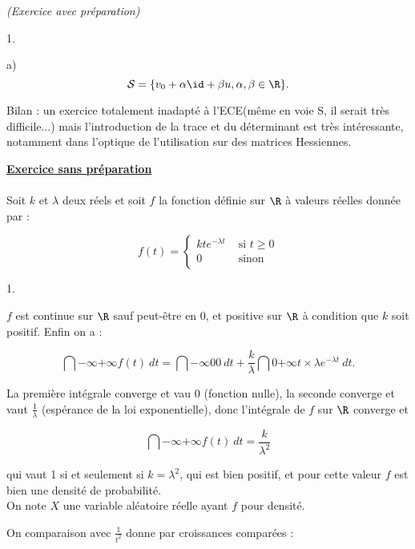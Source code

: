 \documentclass[11pt]{article}%
\begin{document}
\begin{exercice}{\it (Exercice avec préparation)}
\begin{noliste}{1.}
\begin{noliste}{a)}
\[
 \mathcal{S} = \{ v_{0} + \alpha \id + \beta u, \alpha, \beta \in \R
\}. 
\]


 Bilan : un exercice totalement inadapté à l'ECE(même en voie S, il
serait très difficile...) mais l'introduction de la trace et du
déterminant est très intéressante, notamment dans l'optique de
l'utilisation sur des matrices Hessiennes. \\

 \end{noliste}

 \end{noliste}

 \noindent \textbf{\underline{Exercice sans préparation}} \\
\\
 Soit $k$ et $\lambda$ deux réels et soit $f$ la fonction définie sur
$\R$ à valeurs réelles donnée par : 
 
\[
 f(t) = \left\{ 
\begin{array}{cl}
 k t e^{ - \lambda t } & \text{ si } t \geq 0 \\
0 & \text{ sinon } \\
\end{array}
\right. 
\]
 \begin{noliste}{1.}
 \setlength{\itemsep}{4mm}
 \item $f$ est continue sur $\R$ sauf peut-être en 0, et positive sur
$\R$ à condition que $k$ soit positif. Enfin on a : 
 
\[
 \dint{ - \infty }{ + \infty } f(t) \ dt = \dint{- \infty}{0} 0 \ dt +
\frac{ k }{ \lambda } \dint{0}{+ \infty} t \times \lambda e^{ - \lambda
t } \ dt. 
\]

 La première intégrale converge et vau 0 (fonction nulle), la seconde
converge et vaut $ \frac{1}{\lambda}$ (espérance de la loi
exponentielle), donc l'intégrale de $f$ sur $\R$ converge et
 
\[
 \dint{ - \infty }{ + \infty } f(t) \ dt = \frac{ k }{ \lambda^{2} } 
\]

 qui vaut 1 si et seulement si $k = \lambda^{2}$, qui est bien positif,
et pour cette valeur $f$ est bien une densité de probabilité. \\

 On note $X$ une variable aléatoire réelle ayant $f$ pour densité. \\

 \item On comparaison avec $\frac{1}{t^{2}}$ donne par croissances
comparées :
 

\end{noliste}
\end{exercice}
\end{document}
